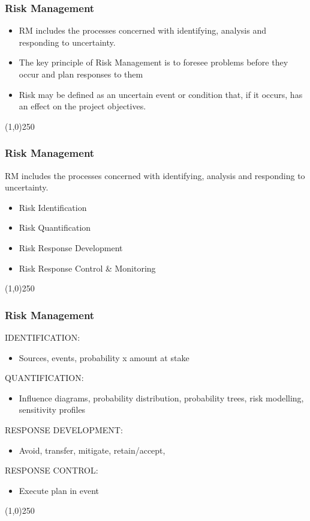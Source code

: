 \begin{frame}
\frametitle{Risk Management}
\begin{itemize}
\item RM includes the processes concerned with identifying, analysis and responding to uncertainty. 
\item The key principle of Risk Management is to foresee problems before they occur and plan responses to them
\item Risk may be defined as an uncertain event or condition that, if it occurs, has an effect on the project objectives.
\end{itemize}
\end{frame}\begin{center}\line(1,0){250}\end{center}


\begin{frame}
\frametitle{Risk Management}
RM includes the processes concerned with identifying, analysis and responding to uncertainty. 
\begin{itemize}
	\item Risk Identification
	\item Risk Quantification
	\item Risk Response Development 
	\item Risk Response Control \& Monitoring
\end{itemize}

\end{frame}\begin{center}\line(1,0){250}\end{center}






\begin{frame}
\frametitle{Risk Management}
IDENTIFICATION: 
\begin{itemize}
	\item Sources, events, probability x amount at stake
\end{itemize}
QUANTIFICATION:  
\begin{itemize}
	\item Influence diagrams, probability distribution, probability trees, risk modelling, sensitivity profiles
\end{itemize}
RESPONSE DEVELOPMENT: 
\begin{itemize}
	\item Avoid, transfer, mitigate, retain/accept, 
\end{itemize}
RESPONSE CONTROL: 
\begin{itemize}
	\item Execute plan in event 
\end{itemize}
\end{frame}\begin{center}\line(1,0){250}\end{center}



